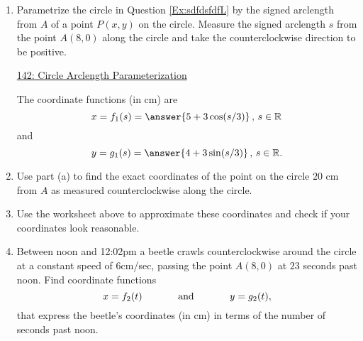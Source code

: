 \documentclass{ximera}
\begin{document}
\begin{question}  \label{QDF09dfdfLKDD}
\begin{enumerate}

\item Parametrize the circle in Question \ref{Ex:sdfdsfdfL} by the signed arclength from $A$ of a point $P(x,y)$ on the circle. Measure the signed arclength $s$ from the point $A(8,0)$ along the circle and take the counterclockwise direction to be positive. 

\begin{onlineOnly}
    \begin{center}
\end{center}
\end{onlineOnly}

\href{https://www.desmos.com/calculator/llrzcv5ckf}{142: Circle Arclength Parameterization}



The coordinate functions (in cm) are 
\[
  x = f_1(s) = \answer{5 + 3 \cos(s/3)} \, , \, s\in \mathbb{R}
\]
and
\[
   y = g_1(s) = \answer{4 + 3 \sin(s/3)} \, , \, s\in \mathbb{R} .
\]

\item Use part (a) to find the exact coordinates of the point on the circle  $20$ cm from $A$ as measured counterclockwise along the circle. 

\item Use the worksheet above to approximate these coordinates and check if your coordinates look reasonable.

\item Between noon and 12:02pm a beetle crawls counterclockwise around the circle at a constant speed of $6$cm/sec, passing the point $A(8,0)$ at $23$ seconds past noon. Find coordinate functions
\[
   x = f_2(t)  \hskip 0.5 in \text{and} \hskip 0.5in  y=g_2(t) ,
\] 
that express the beetle's coordinates (in cm) in terms of the number of seconds past noon.

\end{enumerate}
\end{question}
\end{document}
